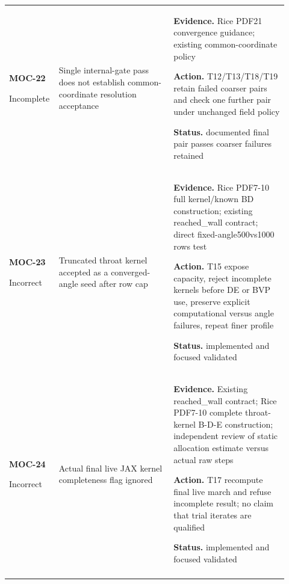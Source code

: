 \begin{longtable}{@{}P{0.12\linewidth}P{0.40\linewidth}P{0.40\linewidth}@{}}
\textbf{MOC-22}\par Incomplete & Single internal-gate pass does not establish common-coordinate resolution acceptance\par {}\par {} & \textbf{Evidence.} Rice PDF21 convergence guidance; existing common-coordinate policy\par \textbf{Action.} T12/T13/T18/T19 retain failed coarser pairs and check one further pair under unchanged field policy\par \textbf{Status.} documented final pair passes coarser failures retained\\ \addlinespace[5pt]
\textbf{MOC-23}\par Incorrect & Truncated throat kernel accepted as a converged-angle seed after row cap\par {}\par {}\par {} & \textbf{Evidence.} Rice PDF7-10 full kernel/known BD construction; existing reached\_wall contract; direct fixed-angle500vs1000 rows test\par \textbf{Action.} T15 expose capacity, reject incomplete kernels before DE or BVP use, preserve explicit computational versus angle failures, repeat finer profile\par \textbf{Status.} implemented and focused validated\\ \addlinespace[5pt]
\textbf{MOC-24}\par Incorrect & Actual final live JAX kernel completeness flag ignored\par {}\par {} & \textbf{Evidence.} Existing reached\_wall contract; Rice PDF7-10 complete throat-kernel B-D-E construction; independent review of static allocation estimate versus actual raw steps\par \textbf{Action.} T17 recompute final live march and refuse incomplete result; no claim that trial iterates are qualified\par \textbf{Status.} implemented and focused validated\\ \addlinespace[5pt]

\end{longtable}
